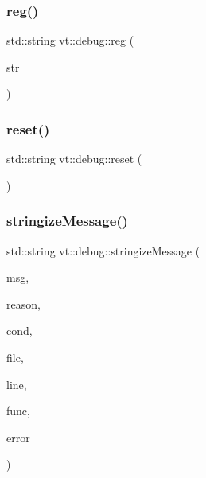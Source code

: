 \mbox{\label{namespacevt_1_1debug_a394711b7d26f45a51bf46c86032742f1}} 
\subsubsection{\texorpdfstring{reg()}{reg()}}
{\footnotesize\ttfamily std\+::string vt\+::debug\+::reg (\begin{DoxyParamCaption}\item[{std\+::string}]{str }\end{DoxyParamCaption})\hspace{0.3cm}{\ttfamily [inline]}}

\mbox{\label{namespacevt_1_1debug_a4456c051bd468fe024334f24887867af}} 
\subsubsection{\texorpdfstring{reset()}{reset()}}
{\footnotesize\ttfamily std\+::string vt\+::debug\+::reset (\begin{DoxyParamCaption}{ }\end{DoxyParamCaption})\hspace{0.3cm}{\ttfamily [inline]}}

\mbox{\label{namespacevt_1_1debug_a63b47ef166cce2fe27d4fbc366a2e23c}} 
\subsubsection{\texorpdfstring{stringize\+Message()}{stringizeMessage()}}
{\footnotesize\ttfamily std\+::string vt\+::debug\+::stringize\+Message (\begin{DoxyParamCaption}\item[{std\+::string const \&}]{msg,  }\item[{std\+::string const \&}]{reason,  }\item[{std\+::string const \&}]{cond,  }\item[{std\+::string const \&}]{file,  }\item[{int const}]{line,  }\item[{std\+::string const \&}]{func,  }\item[{\hyperlink{namespacevt_a793764d753923abc3d32929870beb485}{Error\+Code\+Type}}]{error }\end{DoxyParamCaption})}

